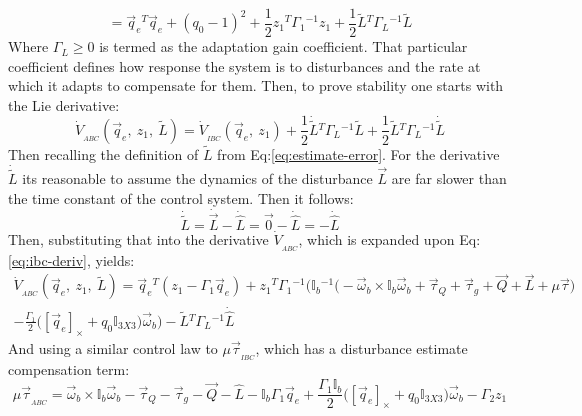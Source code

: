 {\begin{subequations}
\begin{equation}
= \vec{q}_e\text{}^T\vec{q}_e+(q_0-1)^2+\frac{1}{2}z_1\text{}^T\Gamma_1\text{}^{-1}z_1+\frac{1}{2}\widetilde{L}\text{}^T\Gamma_L\text{}^{-1}\widetilde{L}
\end{equation}
\end{subequations}
Where $\Gamma_L\geq 0$ is termed as the adaptation gain coefficient. That particular coefficient defines how response the system is to disturbances and the rate at which it adapts to compensate for them. Then, to prove stability one starts with the Lie derivative:
\begin{equation}
\dot{V}_{_{ABC}}(\vec{q}_e,~z_1,~\widetilde{L})=\dot{V}_{_{IBC}}(\vec{q}_e,~z_1)+\frac{1}{2}\dot{\widetilde{L}}\text{}^T\Gamma_L\text{}^{-1}\widetilde{L}+\frac{1}{2}\widetilde{L}\text{}^T\Gamma_L\text{}^{-1}\dot{\widetilde{L}}
\end{equation}
Then recalling the definition of $\widetilde{L}$ from Eq:\ref{eq:estimate-error}. For the derivative $\dot{\widetilde{L}}$ its reasonable to assume the dynamics of the disturbance $\vec{L}$ are far slower than the time constant of the control system. Then it follows:
\begin{equation}
\dot{\widetilde{L}}=\dot{\vec{L}}-\dot{\hat{L}}=\vec{0}-\dot{\hat{L}}=-\dot{\hat{L}}
\end{equation}
Then, substituting that into the derivative $\dot{V}_{_{ABC}}$, which is expanded upon Eq:\ref{eq:ibc-deriv}, yields:
\begin{subequations}
\begin{multline}
\dot{V}_{_{ABC}}(\vec{q}_e,~z_1,~\widetilde{L})=\vec{q}_e\text{}^T(z_1-\Gamma_1\vec{q}_e)+z_1\text{}^T\Gamma_1\text{}^{-1}\bigg(\mathbb{I}_b\text{}^{-1}\big(-\vec{\omega}_b\times\mathbb{I}_b\vec{\omega}_b+\vec{\tau}_Q+\vec{\tau}_g+\vec{Q}+\vec{L}+\mu\vec{\tau}\big)\\
-\frac{\Gamma_1}{2}\big([\vec{q}_e]_\times+q_0\mathbb{I}_{3X3}\big)\vec{\omega}_b\bigg)-\widetilde{L}\text{}^T\Gamma_L\text{}^{-1}\dot{\hat{L}}
\end{multline}
\end{subequations}
And using a similar control law to $\mu\vec{\tau}_{_{IBC}}$, which has a disturbance estimate compensation term:
\begin{subequations}
\begin{equation}
\mu\vec{\tau}_{_{ABC}}=\vec{\omega}_b\times\mathbb{I}_b\vec{\omega}_b-\vec{\tau}_Q-\vec{\tau}_g-\vec{Q}-\hat{L}-\mathbb{I}_b\Gamma_1\vec{q}_e+\frac{\Gamma_1\mathbb{I}_b}{2}\big([\vec{q}_e]_\times+q_0\mathbb{I}_{3X3}\big)\vec{\omega}_b-\Gamma_2z_1

\end{equation}
\end{subequations}}
